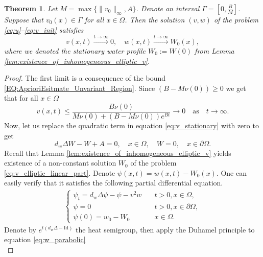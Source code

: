 \documentclass[11pt, a4paper]{article}
\theoremstyle{break}
\newtheorem{thm}{Theorem}[section]
\theoremstyle{break}
\theoremstyle{break}
\theoremstyle{break}
\theoremstyle{break}
\theoremstyle{break}
\theoremstyle{break}
\theoremstyle{break}
\theoremstyle{break}
\theoremstyle{break}
\begin{document}
\begin{thm}
    \label{thm:Exinction-Of-Vegetation}
    Let $M = \max\{\|v_0\|_\infty, A\}$. Denote an interval $\Gamma  = \left[0, \frac{B}{M}\right]$. Suppose that $v_0(x) \in \Gamma$ for all $x \in \Omega$. Then the solution $(v, w)$ of the problem \eqref{eq:u}--\eqref{eq:v_init} satisfies
    \begin{equation}
        v(x,t) \xrightarrow{t \rightarrow \infty} 0, \quad w(x,t) \xrightarrow{t \rightarrow \infty} W_0(x),
    \end{equation}
    where we denoted the stationary water profile $W_0 := W(0)$ from Lemma \ref{lem:existence_of_inhomogeneous_elliptic_v}.
\end{thm}
\begin{proof}
    The first limit is a consequence of the bound \eqref{EQ:AprioriEsitmate_Unvariant_Region}. Since $(B - M\nu(0)) \geq 0$ we get that for all $x \in \Omega$
    \begin{equation*}
        v(x,t) \leq \frac{B\nu(0)}{M \nu(0) + 
        (B - M \nu(0)) e^{B t}} \rightarrow 0 \quad \text{as} \quad t \rightarrow \infty.
    \end{equation*}
    Now, let us replace the quadratic term in equation \eqref{eq:v_stationary} with zero to get
    \begin{equation}
        \label{eq:v_elliptic_linear_part}
        d_w \Delta W - W + A = 0, \quad x \in \Omega, \quad W = 0, \quad x \in \partial \Omega.
    \end{equation}
    Recall that Lemma \ref{lem:existence_of_inhomogeneous_elliptic_v} yields existence of a non-constant solution $W_0$ of the problem \eqref{eq:v_elliptic_linear_part}. Denote $\psi(x,t) = w(x,t) - W_0(x)$. One can easily verify that it satisfies the following partial differential equation.
    \begin{align}
        \label{eq:w_parabolic}
        \begin{cases}
            \psi_t = d_w\Delta \psi - \psi - v^2w &\quad t > 0, x \in \Omega, \\
            \psi = 0 &\quad t > 0, x \in \partial\Omega, \\
            \psi(0) = w_0 - W_0 &\quad x \in \Omega.
        \end{cases}
    \end{align}
    Denote by $e^{t(d_w\Delta - \mathrm{Id})}$ the heat semigroup, then apply the Duhamel principle to equation \eqref{eq:w_parabolic}
    \begin{equation}
        \label{eq:w_duhmel_principle}

\end{equation}
\end{proof}
\end{document}
